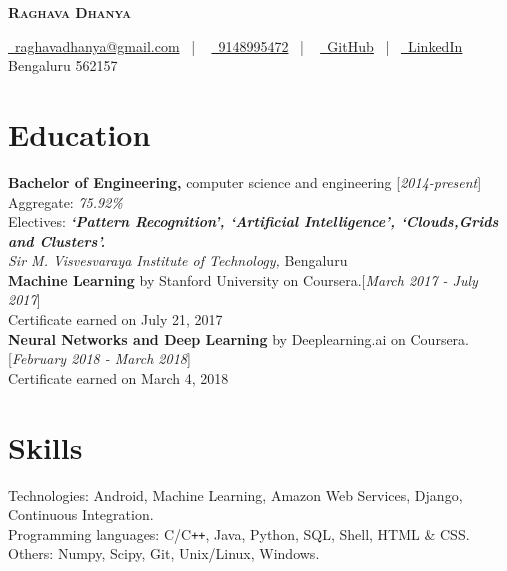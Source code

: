 \documentclass[10pt]{article}
\begin{document}
\thispagestyle{empty}

\begin{center}
 \textbf{\textsc{\color{anotherred}\Huge Raghava Dhanya}}\\[10pt] %
\end{center}

\begin{center}
 \href{mailto:raghavadhanya@gmail.com}{\faEnvelope\ raghavadhanya@gmail.com}
 \ | \ %
 \href{tel:9148995472}{\faPhoneSquare\ 9148995472} \ | \ %
 \href{https://github.com/RaghavaDhanya}{ \underline{\faGithubSquare\
 GitHub}} \ | \ \href{https://in.linkedin.com/in/raghavadhanya}{\underline
 {\faLinkedinSquare\ LinkedIn}} \\
 Bengaluru 562157
\end{center}

\section{Education} \textbf{Bachelor of Engineering,} computer science
and engineering \hfill [\textit{2014-present}]\\
Aggregate: \textit{75.92\%}\\
Electives: \textbf{\textit{`Pattern Recognition', `Artificial Intelligence',
`Clouds,Grids and Clusters'.}}\\
\textit{Sir M. Visvesvaraya Institute of Technology,} Bengaluru
\medskip
\\
\textbf{Machine Learning} by Stanford University on Coursera.\hfill [\textit
{March 2017 - July 2017}]\\
Certificate earned on July 21, 2017
\medskip\\ 
\textbf{Neural Networks and Deep Learning} by Deeplearning.ai on Coursera.\hfill [\textit
{February 2018 - March 2018}]\\
Certificate earned on March 4, 2018 

\section{Skills} Technologies: Android, Machine Learning, Amazon Web
Services, Django, Continuous Integration.\\
Programming languages: C/C\texttt{++}, Java, Python, SQL, Shell,
HTML \& CSS.\\
Others: Numpy, Scipy, Git, Unix/Linux, Windows. 
\end{document}

